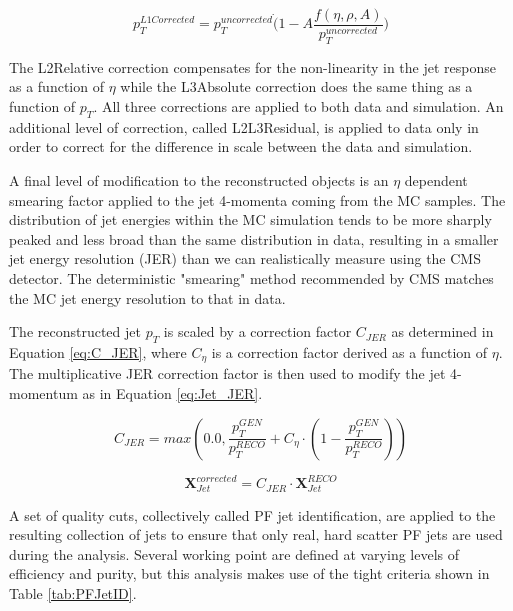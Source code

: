 \begin{equation}
\label{pileupeq}
p_{T}^{L1Corrected} = p_{T}^{uncorrected}\dot(1 - A\frac{f(\eta,\rho,A)}{p_{T}^{uncorrected}})
\end{equation}

The L2Relative correction compensates for the non-linearity in the jet response as a function of $\eta$ while the L3Absolute correction does the same thing as a function of $p_{T}$. All three corrections are applied to both data and simulation. An additional level of correction, called L2L3Residual, is applied to data only in order to correct for the difference in scale between the data and simulation.

A final level of modification to the reconstructed objects is an $\eta$ dependent smearing factor applied to the jet 4-momenta coming from the MC samples. The distribution of jet energies within the MC simulation tends to be more sharply peaked and less broad than the same distribution in data, resulting in a smaller jet energy resolution (JER) than we can realistically measure using the CMS detector. The deterministic "smearing" method recommended by CMS\cite{JetEnergyResolutionTwiki} matches the MC jet energy resolution to that in data. 

The reconstructed jet $p_{T}$ is scaled by a correction factor $C_{JER}$ as determined in Equation \ref{eq:C_JER}, where $C_{\eta}$ is a correction factor derived as a function of $\eta$. The multiplicative JER correction factor is then used to modify the jet 4-momentum as in Equation \ref{eq:Jet_JER}.

\begin{equation}
\label{eq:C_JER}
C_{JER}=max\left(0.0,\frac{p_{T}^{GEN}}{p_{T}^{RECO}}+C_{\eta}\cdot\left(1-\frac{p_{T}^{GEN}}{p_{T}^{RECO}}\right)\right)
\end{equation}

\begin{equation}
\label{eq:Jet_JER}
\textbf{X}_{Jet}^{corrected}=C_{JER}{\cdot}\textbf{X}_{Jet}^{RECO}
\end{equation}

A set of quality cuts, collectively called PF jet identification, are applied to the resulting collection of jets to ensure that only real, hard scatter PF jets are used during the analysis\cite{CMS-AN-2010-003}. Several working point are defined at varying levels of efficiency and purity, but this analysis makes use of the tight criteria shown in Table \ref{tab:PFJetID}\cite{PFJetID}.

